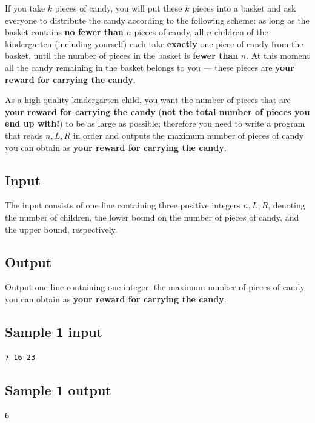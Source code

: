 \documentclass[11pt]{article}
\begin{document}
If you take $k$ pieces of candy, you will put these $k$ pieces into a
basket and ask everyone to distribute the candy according to the following
scheme:
as long as the basket contains \textbf{no fewer than} $n$ pieces of candy,
all $n$ children of the kindergarten (including yourself) each take
\textbf{exactly} one piece of candy from the basket,
until the number of pieces in the basket is \textbf{fewer than} $n$.
At this moment all the candy remaining in the basket belongs to you ---
these pieces are \textbf{your reward for carrying the candy}.

As a high-quality kindergarten child, you want the number of pieces that
are \textbf{your reward for carrying the candy}
(\textbf{not the total number of pieces you end up with!})
to be as large as possible;
therefore you need to write a program that reads $n, L, R$ in order and
outputs the maximum number of pieces of candy you can obtain as
\textbf{your reward for carrying the candy}.

\subsection*{Input}

The input consists of one line containing three positive integers
$n, L, R$,
denoting the number of children, the lower bound on the number of pieces
of candy, and the upper bound, respectively.

\subsection*{Output}

Output one line containing one integer:
the maximum number of pieces of candy you can obtain as
\textbf{your reward for carrying the candy}.

\subsection*{Sample 1 input}

\begin{verbatim}
7 16 23
\end{verbatim}

\subsection*{Sample 1 output}

\begin{verbatim}
6
\end{verbatim}
\end{document}
